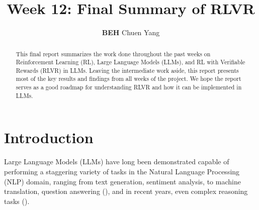 \documentclass{article} %
\title{Week 12: Final Summary of RLVR}
\author{\textbf{BEH} Chuen Yang}
\theoremstyle{definition}
\begin{document}
\ifcolmsubmission
\linenumbers
\fi

\maketitle


\begin{abstract}
    This final report summarizes the work done throughout the past weeks on Reinforcement Learning (RL), Large Language Models (LLMs),
    and RL with Verifiable Rewards (RLVR) in LLMs.
    Leaving the intermediate work aside, this report presents most of the key results and findings from all weeks of the project.
    We hope the report serves as a good roadmap for understanding RLVR and how it can be implemented in LLMs.
\end{abstract}

\section{Introduction}
Large Language Models (LLMs) have long been demonstrated capable of performing a staggering variety of tasks
in the Natural Language Processing (NLP) domain, ranging from text generation, 
sentiment analysis, to machine translation, question answering (\cite{Brown-et-al-2020}),
and in recent years, even complex reasoning tasks (\cite{tulu3, GRPO, r1}).
\end{document}
